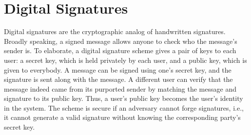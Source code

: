 \documentclass{article}
\begin{document}


\section*{Digital Signatures}
Digital signatures are the cryptographic analog of handwritten signatures. Broadly speaking, a signed message allows anyone to check who the message’s sender is. To elaborate, a digital signature scheme gives a pair of keys to each user: a secret key, which is held privately by each user, and a public key, which is given to everybody. A message can be signed using one’s secret key, and the signature is sent along with the message. A different user can verify that the message indeed came from its purported sender by matching the message and signature to its public key. Thus, a user’s public key becomes the user’s identity in the system. The scheme is secure if an adversary cannot forge signatures, i.e., it cannot generate a valid signature without knowing the corresponding party’s secret key. 
\end{document}
